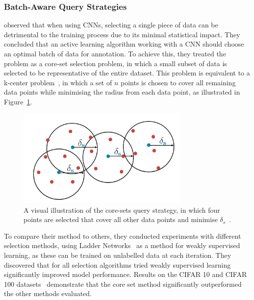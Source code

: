 \subsubsection{Batch-Aware Query Strategies}
\cite{sener2017active} observed that when using CNNs, selecting a single piece of data can be detrimental to the training process due to its minimal statistical impact. They concluded that an active learning algorithm working with a CNN should choose an optimal batch of data for annotation. To achieve this, they treated the problem as a core-set selection problem, in which a small subset of data is selected to be representative of the entire dataset. This problem is equivalent to a k-center problem~\citep{farahani2009facility}, in which a set of $n$ points is chosen to cover all remaining data points while minimising the radius from each data point, as illustrated in Figure~\ref{fig:core-set}.

\begin{figure}[h]
	\centering
	\includegraphics[width=0.75\textwidth]{images/core-set.png}
	\caption{A visual illustration of the core-sets query strategy, in which four points are selected that cover all other data points and minimise $\delta_s$~\citep{sener2017active}.}
	\label{fig:core-set}
\end{figure}

To compare their method to others, they conducted experiments with different selection methods, using Ladder Networks~\citep{rasmus2015semi} as a method for weakly supervised learning, as these can be trained on unlabelled data at each iteration. They discovered that for all selection algorithms tried weakly supervised learning significantly improved model performance. Results on the CIFAR 10 and CIFAR 100 datasets~\citep{krizhevsky2009learning} demonstrate that the core set method significantly outperformed the other methods evaluated.

